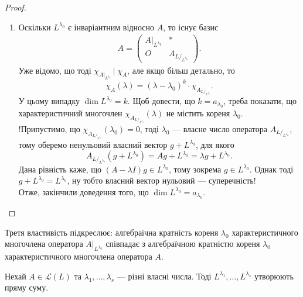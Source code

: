 \documentclass{math_library}
\begin{document}
\begin{proof}
\begin{enumerate}[topsep=0pt,wide=0pt,label={\arabic*)}]
\item Оскільки $L^{\lambda_0}$ є інваріантним відносно $A$, то існує базис
\begin{align*}
A = \begin{pmatrix}
A|_{L^{\lambda_0}} & * \\
O & A_{L/_{L^{\lambda_0}}}
\end{pmatrix}.
\end{align*}
Уже відомо, що тоді $\chi_{A|_{L^\lambda}} \mid \chi_A$, але якщо більш детально, то
\[
\chi_A(\lambda) = (\lambda-\lambda_0)^k \cdot \chi_{A_{L/_{L^{\lambda_0}}}}.
\]
У цьому випадку $\dim L^{\lambda_0} = k$. Щоб довести, що $k = a_{\lambda_0}$, треба показати, що характеристичний многочлен $\chi_{A_{L/_{L^{\lambda_0}}}}(\lambda)$ не містить кореня $\lambda_0$.\\
!Припустимо, що $\chi_{A_{L/_{L^{\lambda_0}}}}(\lambda_0) = 0$, тоді $\lambda_0$ --- власне число оператора $A_{L/_{L^{\lambda_0}}}$, тому оберемо ненульовий власний вектор $g + L^{\lambda_0}$, для якого
\[
A_{L/_{L^{\lambda_0}}}(g+L^{\lambda_0}) = Ag + L^{\lambda_0} = \lambda g + L^{\lambda_0}.
\]
Дана рівність каже, що $(A-\lambda I)g \in L^{\lambda_0}$, тому зокрема $g \in L^{\lambda_0}$. Однак тоді $g + L^{\lambda_0} = L^{\lambda_0}$, ну тобто власний вектор нульовий --- суперечність!\\
Отже, закінчили доведення того, що $\dim L^{\lambda_0} = a_{\lambda_0}$. \qedhere
\end{enumerate}
\end{proof}

\begin{remark}
Третя властивість підкреслює: алгебраїчна кратність кореня $\lambda_0$ характеристичного многочлена оператора $A|_{L^{\lambda_0}}$ співпадає з алгебраїчною кратністю кореня $\lambda_0$ характеристичного многочлена оператора $A$.
\end{remark}

\begin{proposition}
Нехай $A \in \mathcal{L}(L)$ та $\lambda_1,\dots,\lambda_s$ --- різні власні числа. Тоді $L^{\lambda_1}, \dots, L^{\lambda_s}$ утворюють пряму суму.
\end{proposition}
\end{document}
